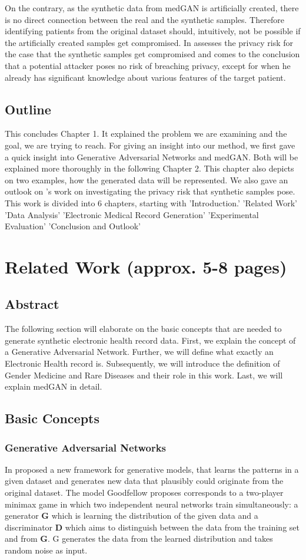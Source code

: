 \documentclass[11pt, a4paper]{book}
\begin{document}
On the contrary, as the synthetic data from medGAN is artificially created, there is no direct connection between the real and the synthetic samples. Therefore identifying patients from the original dataset should, intuitively, not be possible if the artificially created samples get compromised. In \cite{Choi2017} assesses the privacy risk for the case that the synthetic samples get compromised and comes to the conclusion that a potential attacker poses no risk of breaching privacy, except for when he already has significant knowledge about various features of the target patient.
\section{Outline}
This concludes Chapter 1. It explained the problem we are examining and the goal, we are trying to reach.
For giving an insight into our method, we first gave a quick insight into Generative Adversarial Networks and medGAN. Both will be explained more thoroughly in the following Chapter 2. This chapter also depicts on two examples, how the generated data will be represented. We also gave an outlook on \cite{Choi2017}'s work on investigating the privacy risk that synthetic samples pose.
This work is divided into 6 chapters, starting with 'Introduction.'
'Related Work'
'Data Analysis'
'Electronic Medical Record Generation'
'Experimental Evaluation'
'Conclusion and Outlook'
\chapter{Related Work (approx. 5-8 pages)}
\section{Abstract}
The following section will elaborate on the basic concepts that are needed to  generate synthetic electronic health record data.
First, we explain the concept of a Generative Adversarial Network. Further, we will define what exactly an Electronic Health record is. Subsequently, we will introduce the definition of Gender Medicine and Rare Diseases and their role in this work. Last, we will explain medGAN in detail.

\section{Basic Concepts}
\subsection{Generative Adversarial Networks}
In \cite{goodfellow2014generative} proposed a new framework for generative models, that learns the patterns in a given dataset and generates new data that plausibly could originate from the original dataset.
 The model Goodfellow proposes corresponds to a two-player minimax game in which two independent neural networks train simultaneously: a generator \textbf{G} which is learning the distribution of the given data and a discriminator \textbf{D} which aims to distinguish between the data from the training set and from \textbf{G}. G generates the data from the learned distribution and takes random noise as input.
\end{document}
